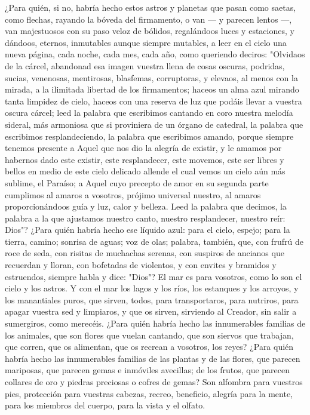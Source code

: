\documentclass[12pt]{book} %
\begin{document}
¿Para quién, si no, habría hecho estos astros y planetas que pasan como saetas, como flechas, rayando la bóveda del firmamento, o van — y parecen lentos —, van majestuosos con su paso veloz de bólidos, regalándoos luces y estaciones, y dándoos, eternos, inmutables aunque siempre mutables, a leer en el cielo una nueva página, cada noche, cada mes, cada año, como queriendo deciros: "Olvidaos de la cárcel, abandonad esa imagen vuestra llena de cosas oscuras, podridas, sucias, venenosas, mentirosas, blasfemas, corruptoras, y elevaos, al menos con la mirada, a la ilimitada libertad de los firmamentos; haceos un alma azul mirando tanta limpidez de cielo, haceos con una reserva de luz que podáis llevar a vuestra oscura cárcel; leed la palabra que escribimos cantando en coro nuestra melodía sideral, más armoniosa que si proviniera de un órgano de catedral, la palabra que escribimos resplandeciendo, la palabra que escribimos amando, porque siempre tenemos presente a Aquel que nos dio la alegría de existir, y le amamos por habernos dado este existir, este resplandecer, este movemos, este ser libres y bellos en medio de este cielo delicado allende el cual vemos un cielo aún más sublime, el Paraíso; a Aquel cuyo precepto de amor en su segunda parte cumplimos al amaros a vosotros, prójimo universal nuestro, al amaros proporcionándoos guía y luz, calor y belleza. Leed la palabra que decimos, la palabra a la que ajustamos nuestro canto, nuestro resplandecer, nuestro reír: Dios"? 
¿Para quién habría hecho ese líquido azul: para el cielo, espejo; para la tierra, camino; sonrisa de aguas; voz de olas; 
palabra, también, que, con frufrú de roce de seda, con risitas de muchachas serenas, con suspiros de ancianos que recuerdan y lloran, con bofetadas de violentos, y con envites y bramidos y estruendos, siempre habla y dice: "Dios"? El mar es para vosotros, como lo son el cielo y los astros. Y con el mar los lagos y los ríos, los estanques y los arroyos, y los manantiales puros, que sirven, todos, para transportaros, para nutriros, para apagar vuestra sed y limpiaros, y que os sirven, sirviendo al Creador, sin salir a sumergiros, como merecéis. 
¿Para quién habría hecho las innumerables familias de los animales, que son flores que vuelan cantando, que son 
siervos que trabajan, que corren, que os alimentan, que os recrean a vosotros, los reyes? 
¿Para quién habría hecho las innumerables familias de las plantas y de las flores, que parecen mariposas, que parecen 
gemas e inmóviles avecillas; de los frutos, que parecen collares de oro y piedras preciosas o cofres de gemas? Son alfombra para vuestros pies, protección para vuestras cabezas, recreo, beneficio, alegría para la mente, para los miembros del cuerpo, para la vista y el olfato. 
\end{document}
